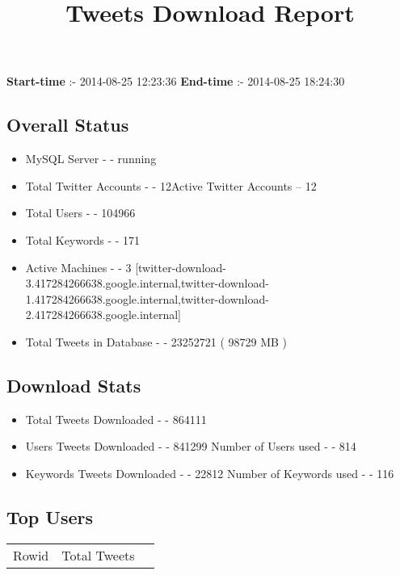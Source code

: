 \documentclass{article}\usepackage[T1]{fontenc}
\begin{document}
\title{\textbf{Tweets Download Report}}
               \date{}
                \maketitle
               \centerline{\textbf{Start-time} :- 2014-08-25 12:23:36 \hspace{40pt} \textbf{End-time} :- 2014-08-25 18:24:30}               \subsection*{Overall Status}                \begin{itemize}                \item MySQL Server - - running               \item Total Twitter Accounts - - 12\newline Active Twitter Accounts -- 12               \item Total Users - - 104966               \item Total Keywords - - 171               \item Active Machines - - 3 [twitter-download-3.417284266638.google.internal,twitter-download-1.417284266638.google.internal,twitter-download-2.417284266638.google.internal]               \item Total Tweets in Database - - 23252721 ( 98729 MB )               \end{itemize}               \subsection*{Download Stats}                \begin{itemize}                \item Total Tweets Downloaded - - 864111               \item Users Tweets Downloaded - - 841299 \newline Number of Users used - - 814               \item Keywords Tweets Downloaded - - 22812 \newline Number of Keywords used - - 116              \end{itemize}              \subsection*{Top Users}\begin{tabular}{|c|c|c|}         \hline         Rowid & Total Tweets \\ 

\end{tabular}
\end{document}
